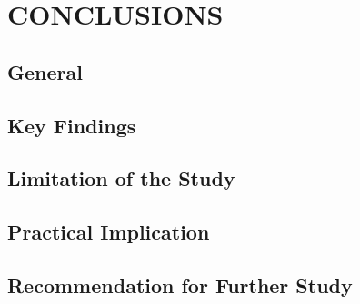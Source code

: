 ﻿\chapter{CONCLUSIONS}
\section{General}
\section{Key Findings}
\section{Limitation of the Study}
\section{Practical Implication}
\section{Recommendation for Further Study}

